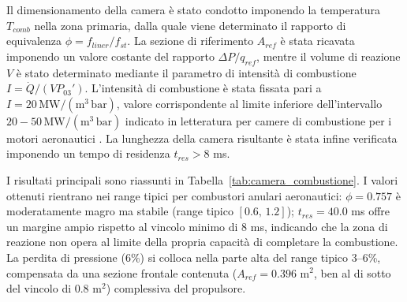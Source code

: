 Il dimensionamento della camera è stato condotto imponendo la temperatura
$T_{comb}$ nella zona primaria, dalla quale viene determinato il rapporto
di equivalenza $\phi=f_{liner}/f_{st}$. La sezione di riferimento
$A_{ref}$ è stata ricavata imponendo un valore costante del rapporto
$\Delta P/q_{ref}$, mentre il volume di reazione $V$ è stato determinato
mediante il parametro di intensità di combustione
$I=\dot{Q}/(VP_{03}')$. L'intensità di combustione è stata fissata pari a
\(I=20\,\mathrm{MW/(m^3\,bar)}\), valore corrispondente al limite inferiore
dell'intervallo \(20{-}50\,\mathrm{MW/(m^3\,bar)}\) indicato in letteratura
per camere di combustione per i motori aeronautici \cite{cohen2001gas}.
La lunghezza della camera risultante è stata infine
verificata imponendo un tempo di residenza $t_{res}>8$ ms.

I risultati principali sono riassunti in Tabella~\ref{tab:camera_combustione}. I valori ottenuti rientrano nei range tipici per combustori anulari aeronautici: $\phi=0.757$ è moderatamente magro ma stabile (range tipico $[0.6,\,1.2]$); $t_{res}=40.0$ ms offre un margine ampio rispetto al vincolo minimo di 8 ms, indicando che la zona di reazione non opera al limite della propria capacità di completare la combustione. La perdita di pressione (6\%) si colloca nella parte alta del range tipico 3--6\%, compensata da una sezione frontale contenuta ($A_{ref}=0.396$ m$^2$, ben al di sotto del vincolo di 0.8 m$^2$) complessiva del propulsore.